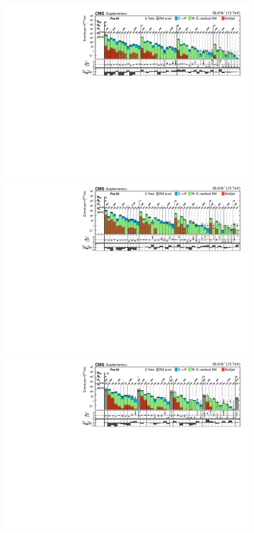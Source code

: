 \begin{figure}
    \begin{center}
            \includegraphics[width=0.98\textwidth]{Supplementary/FullBinning_results_4jet_no-fit_aux}
            \includegraphics[width=0.98\textwidth]{Supplementary/FullBinning_results_5jet_no-fit_aux}\\
            \includegraphics[width=0.98\textwidth]{Supplementary/FullBinning_results_6+_jets_no-fit_aux}\\

\end{center}
\end{figure}
